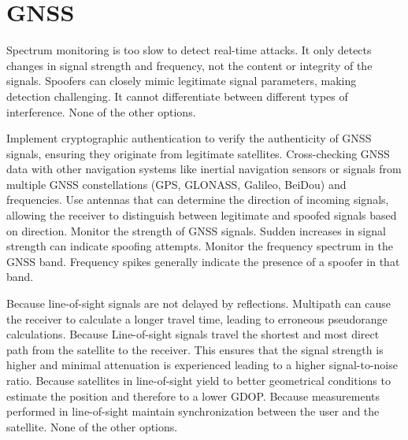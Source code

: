 \section{GNSS}

\begin{checkboxes}
    \choice Spectrum monitoring is too slow to detect real-time attacks.
    \CorrectChoice It only detects changes in signal strength and frequency, not the content or integrity of the signals.
    \CorrectChoice Spoofers can closely mimic legitimate signal parameters, making detection challenging.
    \choice It cannot differentiate between different types of interference.
    \choice None of the other options.
\end{checkboxes}


\begin{checkboxes}
    \choice Implement cryptographic authentication to verify the authenticity of GNSS signals, ensuring they originate from legitimate satellites.
    \choice Cross-checking GNSS data with other navigation systems like inertial navigation sensors or signals from multiple GNSS constellations (GPS, GLONASS, Galileo, BeiDou) and frequencies.
    \choice Use antennas that can determine the direction of incoming signals, allowing the receiver to distinguish between legitimate and spoofed signals based on direction.
    \choice Monitor the strength of GNSS signals. Sudden increases in signal strength can indicate spoofing attempts.
    \CorrectChoice Monitor the frequency spectrum in the GNSS band. Frequency spikes generally indicate the presence of a spoofer in that band.
\end{checkboxes}


\begin{checkboxes}
    \CorrectChoice Because line-of-sight signals are not delayed by reflections. Multipath can cause the receiver to calculate a longer travel time, leading to erroneous pseudorange calculations.
    \CorrectChoice Because Line-of-sight signals travel the shortest and most direct path from the satellite to the receiver. This ensures that the signal strength is higher and minimal attenuation is experienced leading to a higher signal-to-noise ratio.
    \choice Because satellites in line-of-sight yield to better geometrical conditions to estimate the position and therefore to a lower GDOP.
    \choice Because measurements performed in line-of-sight maintain synchronization between the user and the satellite.
    \choice None of the other options.
\end{checkboxes}


